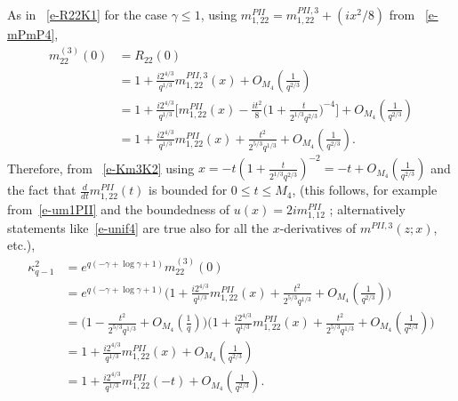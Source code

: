 \documentclass{amsart}
\theoremstyle{definition}
\theoremstyle{remark}
\numberwithin{equation}{section}
\begin{document}
As in ~\eqref{e-R22K1} for the case $\gamma \le 1$, 
using $m_{1,22}^{PII}=m_{1,22}^{PII,3}+(ix^2/8)$
from ~\eqref{e-mPmP4},
\begin{equation}\label{e-z34}
  \begin{split}
    m_{22}^{(3)}(0)&= R_{22}(0)\\
    &= 1+\frac{i2^{4/3}}{q^{1/3}}m^{PII,3}_{1,22}(x)+O_{M_4}(\frac1{q^{2/3}})\\
    &= 1+\frac{i2^{4/3}}{q^{1/3}} \biggl[m^{PII}_{1,22}(x) 
-\frac{it^2}{8}\bigl( 1+\frac{t}{2^{1/3}q^{2/3}}\bigr)^{-4}\biggr] 
+O_{M_4}(\frac1{q^{2/3}})\\
    &= 1+\frac{i2^{4/3}}{q^{1/3}}m^{PII}_{1,22}(x) +
\frac{t^2}{2^{5/3}q^{1/3}} +O_{M_4}(\frac1{q^{2/3}}).
  \end{split}
\end{equation}
Therefore, from ~\eqref{e-Km3K2} 
using  $x=-t(1+\frac{t}{2^{1/3}q^{2/3}})^{-2}=-t+O_{M_4}(\frac1{q^{2/3}})$
and the fact that $\frac{d}{dt}m^{PII}_{1,22}(t)$ is bounded for $0\le t\le M_4$,
(this follows, for example from~\eqref{e-um1PII} and the boundedness of 
$u(x)=2im_{1,12}^{PII}$ ; alternatively statements like~\eqref{e-unif4} are true also 
for all the $x$-derivatives of $m^{PII,3}(z;x)$, etc.), 
\begin{equation}
  \begin{split}
  \kappa^2_{q-1}&=e^{q(-\gamma+\log \gamma+1)}m^{(3)}_{22}(0)\\
  & =e^{q(-\gamma+\log \gamma+1)} \biggl( 1 +\frac{i2^{4/3}}{q^{1/3}}m^{PII}_{1,22}(x) +\frac{t^2}{2^{5/3}q^{1/3}} +O_{M_4}(\frac1{q^{2/3}}) \biggr)\\
  & = \biggl( 1-\frac{t^2}{2^{5/3}q^{1/3}} +O_{M_4}(\frac1{q}) \biggr) 
\biggl( 1 +\frac{i2^{4/3}}{q^{1/3}}m^{PII}_{1,22}(x) 
+\frac{t^2}{2^{5/3}q^{1/3}} +O_{M_4}(\frac1{q^{2/3}}) \biggr) \\
  & =1 +\frac{i2^{4/3}}{q^{1/3}}m^{PII}_{1,22}(x) +O_{M_4}(\frac1{q^{2/3}})\\
  & =1 +\frac{i2^{4/3}}{q^{1/3}}m^{PII}_{1,22}(-t) +O_{M_4}(\frac1{q^{2/3}}).
  \end{split}
\end{equation}
\end{document}
